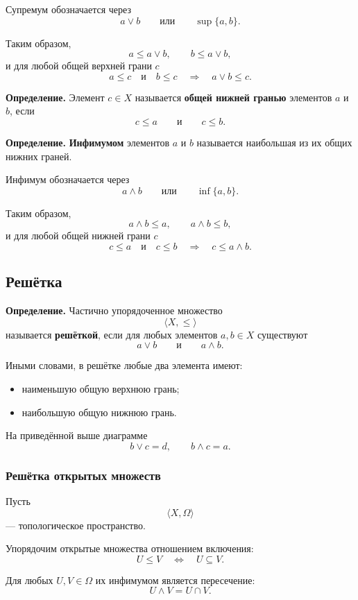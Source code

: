 \documentclass[12pt,a4paper,oneside,openany]{book}
\theoremstyle{definition}
\theoremstyle{plain}
\theoremstyle{remark}
\begin{document}
Супремум обозначается через
\[
a\vee b
\qquad\text{или}\qquad
\sup\{a,b\}.
\]

Таким образом,
\[
a\leq a\vee b,
\qquad
b\leq a\vee b,
\]
и для любой общей верхней грани \(c\)
\[
a\leq c
\quad\text{и}\quad
b\leq c
\quad\Longrightarrow\quad
a\vee b\leq c.
\]


\textbf{Определение.}
Элемент \(c\in X\) называется \textbf{общей нижней гранью}
элементов \(a\) и \(b\), если
\[
c\leq a
\qquad\text{и}\qquad
c\leq b.
\]

\textbf{Определение.}
\textbf{Инфимумом} элементов \(a\) и \(b\) называется наибольшая
из их общих нижних граней.

Инфимум обозначается через
\[
a\wedge b
\qquad\text{или}\qquad
\inf\{a,b\}.
\]

Таким образом,
\[
a\wedge b\leq a,
\qquad
a\wedge b\leq b,
\]
и для любой общей нижней грани \(c\)
\[
c\leq a
\quad\text{и}\quad
c\leq b
\quad\Longrightarrow\quad
c\leq a\wedge b.
\]

\subsection{Решётка}

\textbf{Определение.}
Частично упорядоченное множество
\[
\langle X,\leq\rangle
\]
называется \textbf{решёткой}, если для любых элементов \(a,b\in X\)
существуют
\[
a\vee b
\qquad\text{и}\qquad
a\wedge b.
\]

Иными словами, в решётке любые два элемента имеют:

\begin{itemize}
    \item наименьшую общую верхнюю грань;
    \item наибольшую общую нижнюю грань.
\end{itemize}

На приведённой выше диаграмме
\[
b\vee c=d,
\qquad
b\wedge c=a.
\]

\subsubsection{Решётка открытых множеств}

Пусть
\[
\langle X,\Omega\rangle
\]
--- топологическое пространство.

Упорядочим открытые множества отношением включения:
\[
U\leq V
\quad\Longleftrightarrow\quad
U\subseteq V.
\]

Для любых \(U,V\in\Omega\) их инфимумом является пересечение:
\[
U\wedge V=U\cap V.
\]
\end{document}
